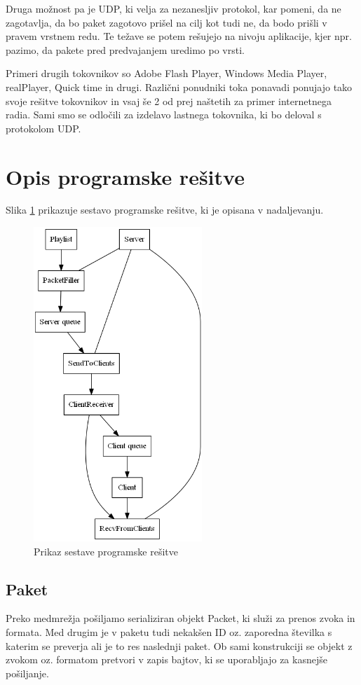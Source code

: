 \documentclass[journal]{IEEEtran}
\begin{document}
Druga možnost pa je UDP, ki velja za nezanesljiv protokol, kar pomeni, da ne zagotavlja, da bo paket zagotovo prišel na cilj kot tudi ne, da bodo prišli v pravem vrstnem redu. Te težave se potem rešujejo na nivoju aplikacije, kjer npr. pazimo, da pakete pred predvajanjem uredimo po vrsti.

Primeri drugih tokovnikov so Adobe Flash Player, Windows Media Player, realPlayer, Quick time in drugi. Različni ponudniki toka ponavadi ponujajo tako svoje rešitve tokovnikov in vsaj še 2 od prej naštetih za primer internetnega radia. Sami smo se odločili za izdelavo lastnega tokovnika, ki bo deloval s protokolom UDP.

 

\section{Opis programske rešitve}

Slika \ref{sestava} prikazuje sestavo programske rešitve, ki je opisana v nadaljevanju.

\begin{figure}[!t]
\centering
\includegraphics[width=2.5in]{sestava.png}
\caption{Prikaz sestave programske rešitve}
\label{sestava}
\end{figure}

\subsection{Paket}
Preko medmrežja pošiljamo serializiran objekt Packet, ki služi za prenos zvoka in formata. Med drugim je v paketu tudi nekakšen ID oz. zaporedna številka s katerim se preverja ali je to res naslednji paket. Ob sami konstrukciji se objekt z zvokom oz. formatom pretvori v zapis bajtov, ki se uporabljajo za kasnejše pošiljanje.
\end{document}
